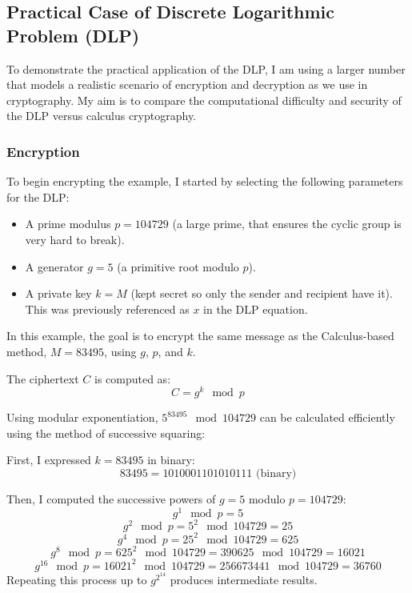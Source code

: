 \documentclass[12pt]{article}
\begin{document}
\subsection*{Practical Case of Discrete Logarithmic Problem (DLP)}

To demonstrate the practical application of the DLP, I am using a larger number that models a realistic scenario of encryption and decryption as we use in cryptography. My aim is to compare the computational difficulty and security of the DLP versus calculus cryptography.

\subsubsection*{Encryption}

To begin encrypting the example, I started by selecting the following parameters for the DLP:
\begin{itemize}
    \item A prime modulus \( p = 104729 \) (a large prime, that ensures the cyclic group is very hard to break).
    \item A generator \( g = 5 \) (a primitive root modulo \( p \)).
    \item A private key \( k = M \) (kept secret so only the sender and recipient have it). This was previously referenced as \( x \) in the DLP equation.
\end{itemize}

In this example, the goal is to encrypt the same message as the Calculus-based method, \( M = 83495 \), using \( g \), \( p \), and \( k \).

The ciphertext \( C \) is computed as:
\[
C = g^k \mod p
\]

Using modular exponentiation, \( 5^{83495} \mod 104729 \) can be calculated efficiently using the method of successive squaring:

\vspace{0.1in}

\centering First, I expressed \( k = 83495 \) in binary:
\[
83495 = 1010001101010111 \text{ (binary)}
\]

Then, I computed the successive powers of \( g = 5 \) modulo \( p = 104729 \):
\[
g^1 \mod p = 5
\]
\[
g^2 \mod p = 5^2 \mod 104729 = 25
\]
\[
g^4 \mod p = 25^2 \mod 104729 = 625
\]
\[
g^8 \mod p = 625^2 \mod 104729 = 390625 \mod 104729 = 16021
\]
\[
g^{16} \mod p = 16021^2 \mod 104729 = 256673441 \mod 104729 = 36760
\]
Repeating this process up to \( g^{2^{14}} \) produces intermediate results.
\end{document}
